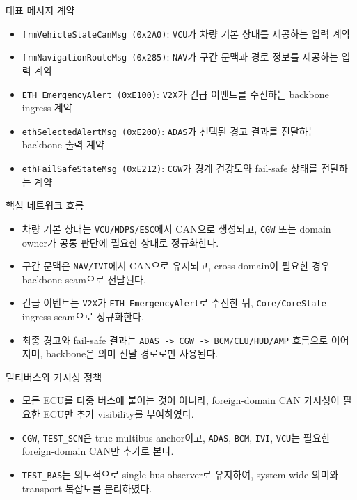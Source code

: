 \documentclass[aspectratio=169,10pt]{beamer}
\begin{document}
\begin{frame}{대표 메시지 계약}
\begin{itemize}
  \item \texttt{frmVehicleStateCanMsg (0x2A0)}: \texttt{VCU}가 차량 기본 상태를 제공하는 입력 계약
  \item \texttt{frmNavigationRouteMsg (0x285)}: \texttt{NAV}가 구간 문맥과 경로 정보를 제공하는 입력 계약
  \item \texttt{ETH\_EmergencyAlert (0xE100)}: \texttt{V2X}가 긴급 이벤트를 수신하는 backbone ingress 계약
  \item \texttt{ethSelectedAlertMsg (0xE200)}: \texttt{ADAS}가 선택된 경고 결과를 전달하는 backbone 출력 계약
  \item \texttt{ethFailSafeStateMsg (0xE212)}: \texttt{CGW}가 경계 건강도와 fail-safe 상태를 전달하는 계약
\end{itemize}
\end{frame}

\begin{frame}{핵심 네트워크 흐름}
\begin{itemize}
  \item 차량 기본 상태는 \texttt{VCU/MDPS/ESC}에서 CAN으로 생성되고, \texttt{CGW} 또는 domain owner가 공통 판단에 필요한 상태로 정규화한다.
  \item 구간 문맥은 \texttt{NAV/IVI}에서 CAN으로 유지되고, cross-domain이 필요한 경우 backbone seam으로 전달된다.
  \item 긴급 이벤트는 \texttt{V2X}가 \texttt{ETH\_EmergencyAlert}로 수신한 뒤, \texttt{Core/CoreState} ingress seam으로 정규화한다.
  \item 최종 경고와 fail-safe 결과는 \texttt{ADAS -> CGW -> BCM/CLU/HUD/AMP} 흐름으로 이어지며, backbone은 의미 전달 경로로만 사용된다.
\end{itemize}
\end{frame}

\begin{frame}{멀티버스와 가시성 정책}
\begin{itemize}
  \item 모든 ECU를 다중 버스에 붙이는 것이 아니라, foreign-domain CAN 가시성이 필요한 ECU만 추가 visibility를 부여하였다.
  \item \texttt{CGW}, \texttt{TEST\_SCN}은 true multibus anchor이고, \texttt{ADAS}, \texttt{BCM}, \texttt{IVI}, \texttt{VCU}는 필요한 foreign-domain CAN만 추가로 본다.
  \item \texttt{TEST\_BAS}는 의도적으로 single-bus observer로 유지하여, system-wide 의미와 transport 복잡도를 분리하였다.
\end{itemize}
\end{frame}
\end{document}
